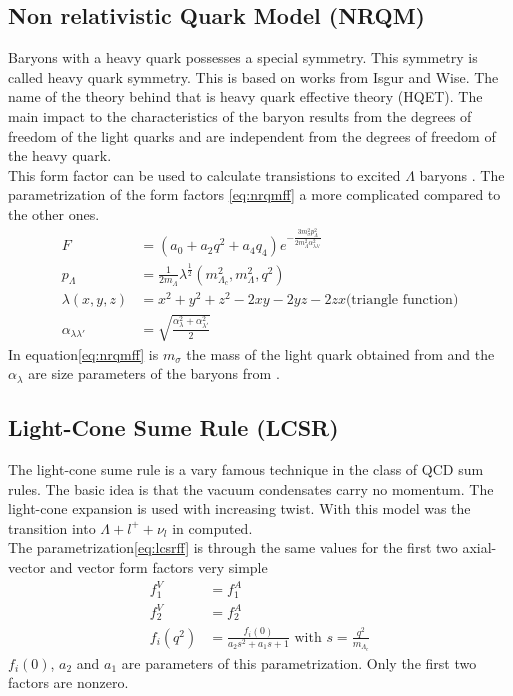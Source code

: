 \subsection{Non relativistic Quark Model (NRQM)}
Baryons with a heavy quark possesses a special symmetry. This symmetry is 
called heavy quark symmetry. This is based on works from Isgur and Wise. The name 
of the theory behind that is heavy quark effective theory (HQET). The main impact 
to the characteristics of the baryon results from the degrees of freedom of the 
light quarks and are independent from the degrees of freedom of the heavy quark.\\
This form factor can be used to calculate transistions to excited \(\Lambda\)
baryons {\cite{NRQM}}. The parametrization of the form factors {\eqref{eq:nrqmff}} a more complicated compared 
to the other ones.
\begin{align}
  F &= \left(a_0 + a_2 q^2 + a_4 q_4\right) e^{- \frac{3 m_\sigma^2 p_\Lambda^2}
  {2 m_\Lambda^2 \alpha_{\lambda \lambda'}^2} } \nonumber\\
  p_\Lambda & = \frac{1}{2 m_\Lambda}  \lambda^\frac{1}{2}(m_{\Lambda_c}^2, m_\Lambda^2, q^2) \nonumber \\
  \lambda(x, y, z) & = x^2 + y^2 + z^2 - 2xy - 2yz - 2zx \text{(triangle function)} \nonumber \\
  \alpha_{\lambda \lambda'} & = \sqrt{\frac{\alpha_\lambda^2 + \alpha_{\lambda'}^2 }{2}} \label{eq:nrqmff}
\end{align}
In equation{\eqref{eq:nrqmff}} is \(m_\sigma\) the mass of the light quark 
obtained from {\cite[p. 13/I]{NRQM}} and the \(\alpha_\lambda\) are size parameters of 
the baryons from {\cite[p. 13/II]{NRQM}}.

\subsection{Light-Cone Sume Rule (LCSR)}
The light-cone sume rule is a vary famous technique in the class of QCD sum 
rules. The basic idea is that the vacuum condensates carry no momentum. The 
light-cone expansion is used with increasing twist. With this model was the 
transition into \(\Lambda + l^+ + \nu_l\) in {\cite{LCSR}}  computed.\\
The parametrization{\eqref{eq:lcsrff}} is through the same values for the 
first two axial-vector and vector form factors very simple
\begin{align}
  f^V_1 & = f^A_1 \nonumber \\
  f^V_2 & = f^A_2 \nonumber \\
  f_i(q^2) & = \frac{f_i(0)}{a_2 s^2 + a_1 s + 1 } \text{ with } s = \frac{q^2}{m_{\Lambda_c}} \label{eq:lcsrff}
\end{align}
\(f_i(0)\), \(a_2\) and \(a_1\) are parameters of this parametrization. Only the 
first two factors are nonzero.

